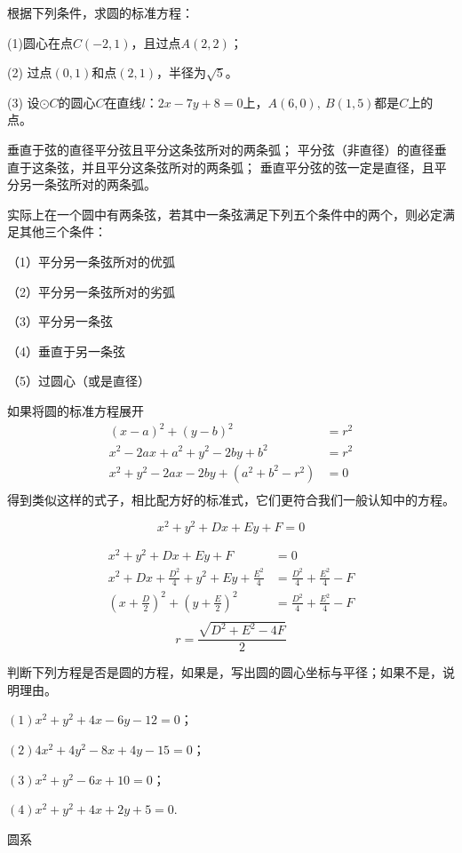 \begin{example}
    根据下列条件，求圆的标准方程：

   (1)圆心在点$C(-2,1)$，且过点$A(2,2)$；

   (2) 过点$(0,1)$和点$(2,1)$，半径为\(\sqrt{5}\)。

   (3) 设\(\odot C\)的圆心$C$在直线$l$：$2x-7y+8=0$上，$A(6,0),\ B(1,5)$都是$C$上的点。
\end{example}
\begin{theorem}[垂径定理]
    垂直于弦的直径平分弦且平分这条弦所对的两条弧；
    平分弦（非直径）的直径垂直于这条弦，并且平分这条弦所对的两条弧；
    垂直平分弦的弦一定是直径，且平分另一条弦所对的两条弧。

    实际上在一个圆中有两条弦，若其中一条弦满足下列五个条件中的两个，则必定满足其他三个条件：

    （1）平分另一条弦所对的优弧
    
    （2）平分另一条弦所对的劣弧
    
    （3）平分另一条弦
    
    （4）垂直于另一条弦
    
    （5）过圆心（或是直径）

\end{theorem}
如果将圆的标准方程展开
\begin{align*}
    (x-a)^2+(y-b)^2&=r^2\\
    x^2-2ax+a^2+y^2-2by+b^2&=r^2\\
    x^2+y^2-2ax-2by+(a^2+b^2-r^2)&=0\\
\end{align*}
得到类似这样的式子，相比配方好的标准式，它们更符合我们一般认知中的方程。
\begin{theorem}[圆的一般方程]
    \begin{equation}
        x^2+y^2+Dx+Ey+F=0
    \end{equation}
\end{theorem}
\begin{jie}
    \begin{align*}
        x^2+y^2+Dx+Ey+F&=0\\
        x^2+Dx+\frac{D^2}{4}+y^2+Ey+\frac{E^2}{4}&=\frac{D^2}{4}+\frac{E^2}{4}-F\\
        (x+\frac{D}{2})^2+(y+\frac{E}{2})^2&=\frac{D^2}{4}+\frac{E^2}{4}-F\\
    \end{align*}
    \[r=\frac{\sqrt{D^2+E^2-4F}}{2}\]
\end{jie}

\begin{example} 判断下列方程是否是圆的方程，如果是，写出圆的圆心坐标与平径；如果不是，说明理由。

    $(1)  x^{2}+y^{2}+4 x-6 y-12=0 $；

$(2)  4 x^{2}+4 y^{2}-8 x+4 y-15=0 $；

$(3)  x^{2}+y^{2}-6 x+10=0 $；

$(4)x^{2}+y^{2}+4x+2y+5=0$.
\end{example}
圆系

